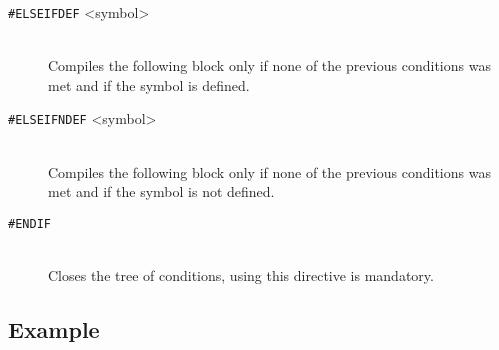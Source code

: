 \begin{description}
        \item[\texttt{\#ELSEIFDEF} <symbol>]~\\
            Compiles the following block only if none of the previous conditions was met and if the symbol is defined.
        \item[\texttt{\#ELSEIFNDEF} <symbol>]~\\
            Compiles the following block only if none of the previous conditions was met and if the symbol is not defined.
        \item[\texttt{\#ENDIF}]~\\
            Closes the tree of conditions, using this directive is mandatory.
    \end{description}

    \subsection{Example}
        ~\\
